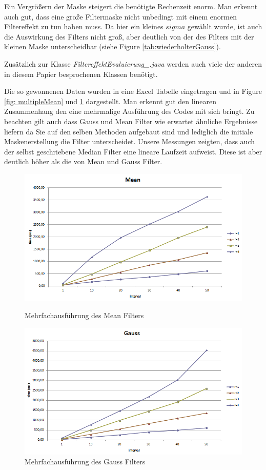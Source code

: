 \documentclass[12pt,german]{article}
\begin{document}
Ein Vergrößern der Maske steigert die benötigte Rechenzeit enorm. Man erkennt auch gut, dass eine große Filtermaske nicht unbedingt mit einem enormen Filtereffekt zu tun haben muss. Da hier ein kleines $sigma$ gewählt wurde, ist auch die Auswirkung des Filters nicht groß, aber deutlich von der des Filters mit der kleinen Maske unterscheidbar (siehe Figure \ref{tab:wiederholterGauss}).


Zusätzlich zur Klasse \textit{FiltereffektEvaluierung\_.java} werden auch viele der anderen in diesem Papier besprochenen Klassen benötigt.


Die so gewonnenen Daten wurden in eine Excel Tabelle eingetragen und in  Figure \ref{fig: multipleMean} und \ref{fig: multipleGauss} dargestellt.  Man erkennt gut den linearen Zusammenhang den eine mehrmalige Ausführung des Codes mit sich bringt. Zu beachten gilt auch dass Gauss und Mean Filter wie erwartet ähnliche Ergebnisse liefern da Sie auf den selben Methoden aufgebaut sind und lediglich die initiale Maskenerstellung die Filter unterscheidet. Unsere Messungen zeigten, dass auch der selbst geschriebene Median Filter eine lineare Laufzeit aufweist. Diese ist aber deutlich höher als die von Mean und Gauss Filter.

\begin{figure} [H]
  \centering
  \includegraphics[width=12cm]{TimeEvaluationGraph_Mean.png}
  \caption{Mehrfachausführung des Mean Filters}
  \label{fig: multipleMean}
  \includegraphics[width=12cm]{TimeEvaluationGraph_Gauss.png}
  \caption{Mehrfachausführung des Gauss Filters}
  \label{fig: multipleGauss}
\end{figure}
\end{document}
